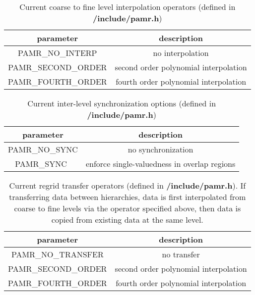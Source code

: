 \documentclass[aps,amssymb,unsortedaddress,nofootinbib]{revtex4}
\begin{document}
\begin{table}
\begin{center}
\begin{tabular}[t]{| c || c |}
\hline
parameter & description \\
\hline
\hline
PAMR\_NO\_INTERP       & no interpolation \\
PAMR\_SECOND\_ORDER    & second order polynomial interpolation\\
PAMR\_FOURTH\_ORDER    & fourth order polynomial interpolation\\
\hline
\end{tabular}
\end{center}
\caption
{ Current coarse to fine level interpolation operators (defined in {\bf /include/pamr.h})
\label{tab_interp_ops}}
\end{table}

\begin{table}
\begin{center}
\begin{tabular}[t]{| c || c |}
\hline
parameter & description \\
\hline
\hline
PAMR\_NO\_SYNC         & no synchronization \\
PAMR\_SYNC\            & enforce single-valuedness in overlap regions\\
\hline
\end{tabular}
\end{center}
\caption
{ Current inter-level synchronization options (defined in {\bf /include/pamr.h})
\label{tab_sync_ops}}
\end{table}

\begin{table}
\begin{center}
\begin{tabular}[t]{| c || c |}
\hline
parameter & description \\
\hline
\hline
PAMR\_NO\_TRANSFER     & no transfer \\
PAMR\_SECOND\_ORDER    & second order polynomial interpolation\\
PAMR\_FOURTH\_ORDER    & fourth order polynomial interpolation\\
\hline
\end{tabular}
\end{center}
\caption
{ Current regrid transfer operators (defined in {\bf /include/pamr.h}). If transferring
data between hierarchies, data is first interpolated from coarse to fine levels
via the operator specified above, then data is copied from existing data at the same level.
\label{tab_trans_ops}}
\end{table}
\end{document}
